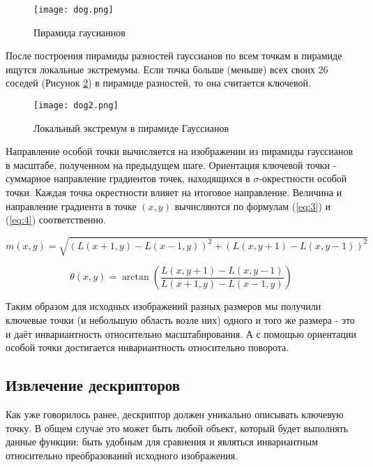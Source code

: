 \begin{figure}[h]
    \centering
    \texttt{[image: dog.png]}
    \caption{Пирамида гаусианнов}
    \label{fig:dog1}
\end{figure}

После построения пирамиды разностей гауссианов по всем точкам в пирамиде ищутся локальные экстремумы. Если точка больше (меньше) всех своих 26 соседей (Рисунок \ref{fig:dog2}) в пирамиде разностей, то она считается ключевой.

\begin{figure}[h]
    \centering
    \texttt{[image: dog2.png]}
    \caption{Локальный экстремум в пирамиде Гауссианов}
    \label{fig:dog2}
\end{figure}

Направление особой точки вычисляется на изображении из пирамиды гауссианов в масштабе, полученном на предыдущем шаге. Ориентация ключевой точки - суммарное направление градиентов точек, находящихся в  $\sigma$-окрестности особой точки. Каждая точка окрестности влияет на итоговое направление. Величина и направление градиента в точке $(x,y)$ вычисляются по формулам (\ref{eq:3}) и (\ref{eq:4}) соответственно.

\begin{equation} \label{eq:3}
    m(x,y)=\sqrt{(L(x+1,y) - L(x-1,y))^2 + (L(x,y+1) - L(x,y-1))^2}
\end{equation}

\begin{equation} \label{eq:4}
    \theta(x,y)=\arctan{\left(\frac{L(x,y+1) - L(x,y-1)}{L(x+1,y) - L(x-1,y)}\right)}
\end{equation}

Таким образом для исходных изображений разных размеров мы получили ключевые точки (и небольшую область возле них) одного и того же размера - это и даёт инвариантность относительно масштабирования. А с помощью ориентации особой точки достигается инвариантность относительно поворота.

\subsection{Извлечение дескрипторов}

Как уже говорилось ранее, дескриптор должен уникально описывать ключевую точку. В общем случае это может быть любой объект, который будет выполнять данные функции: быть удобным для сравнения и являться инвариантным относительно преобразований исходного изображения.

